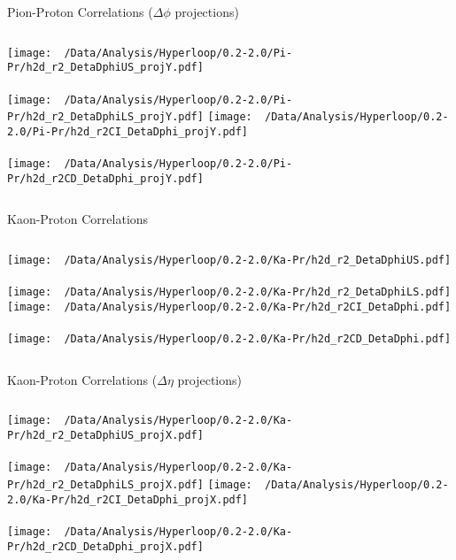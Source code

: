 \documentclass{beamer}
\begin{document}
\begin{frame}{Pion-Proton Correlations ($\Delta\phi$ projections)}
	\begin{columns}
		\centering
		\texttt{[image: ~/Data/Analysis/Hyperloop/0.2-2.0/Pi-Pr/h2d\_r2\_DetaDphiUS\_projY.pdf]}\\~\\
		\texttt{[image: ~/Data/Analysis/Hyperloop/0.2-2.0/Pi-Pr/h2d\_r2\_DetaDphiLS\_projY.pdf]}
		\centering
		\texttt{[image: ~/Data/Analysis/Hyperloop/0.2-2.0/Pi-Pr/h2d\_r2CI\_DetaDphi\_projY.pdf]}\\~\\
		\texttt{[image: ~/Data/Analysis/Hyperloop/0.2-2.0/Pi-Pr/h2d\_r2CD\_DetaDphi\_projY.pdf]}
	\end{columns}
\end{frame}\begin{frame}{Kaon-Proton Correlations}
\begin{columns}
	\column{0.5\linewidth}
	\centering
	\texttt{[image: ~/Data/Analysis/Hyperloop/0.2-2.0/Ka-Pr/h2d\_r2\_DetaDphiUS.pdf]}\\~\\
	\texttt{[image: ~/Data/Analysis/Hyperloop/0.2-2.0/Ka-Pr/h2d\_r2\_DetaDphiLS.pdf]}
	\column{0.5\linewidth}
	\centering
	\texttt{[image: ~/Data/Analysis/Hyperloop/0.2-2.0/Ka-Pr/h2d\_r2CI\_DetaDphi.pdf]}\\~\\
	\texttt{[image: ~/Data/Analysis/Hyperloop/0.2-2.0/Ka-Pr/h2d\_r2CD\_DetaDphi.pdf]}
\end{columns}
\end{frame}
\begin{frame}{Kaon-Proton Correlations ($\Delta\eta$ projections)}
\begin{columns}
	\centering
	\texttt{[image: ~/Data/Analysis/Hyperloop/0.2-2.0/Ka-Pr/h2d\_r2\_DetaDphiUS\_projX.pdf]}\\~\\
	\texttt{[image: ~/Data/Analysis/Hyperloop/0.2-2.0/Ka-Pr/h2d\_r2\_DetaDphiLS\_projX.pdf]}
	\centering
	\texttt{[image: ~/Data/Analysis/Hyperloop/0.2-2.0/Ka-Pr/h2d\_r2CI\_DetaDphi\_projX.pdf]}\\~\\
	\texttt{[image: ~/Data/Analysis/Hyperloop/0.2-2.0/Ka-Pr/h2d\_r2CD\_DetaDphi\_projX.pdf]}
\end{columns}
\end{frame}
\end{document}
